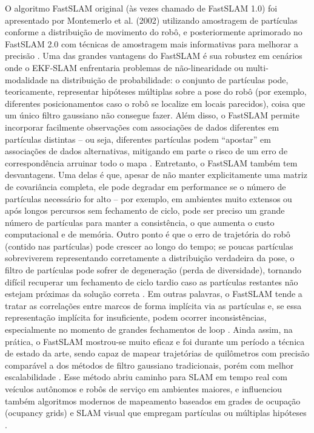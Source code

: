         O algoritmo FastSLAM original (às vezes chamado de FastSLAM 1.0) foi apresentado por Montemerlo et al. (2002) utilizando amostragem de partículas conforme a distribuição de movimento do robô, e posteriormente aprimorado no FastSLAM 2.0 com técnicas de amostragem mais informativas para melhorar a precisão \cite{Montemerlo2002}. Uma das grandes vantagens do FastSLAM é sua robustez em cenários onde o EKF-SLAM enfrentaria problemas de não-linearidade ou multi-modalidade na distribuição de probabilidade: o conjunto de partículas pode, teoricamente, representar hipóteses múltiplas sobre a pose do robô (por exemplo, diferentes posicionamentos caso o robô se localize em locais parecidos), coisa que um único filtro gaussiano não consegue fazer. Além disso, o FastSLAM permite incorporar facilmente observações com associações de dados diferentes em partículas distintas – ou seja, diferentes partículas podem “apostar” em associações de dados alternativas, mitigando em parte o risco de um erro de correspondência arruinar todo o mapa \cite{Thrun2005}. Entretanto, o FastSLAM também tem desvantagens. Uma delas é que, apesar de não manter explicitamente uma matriz de covariância completa, ele pode degradar em performance se o número de partículas necessário for alto – por exemplo, em ambientes muito extensos ou após longos percursos sem fechamento de ciclo, pode ser preciso um grande número de partículas para manter a consistência, o que aumenta o custo computacional e de memória. Outro ponto é que o erro de trajetória do robô (contido nas partículas) pode crescer ao longo do tempo; se poucas partículas sobreviverem representando corretamente a distribuição verdadeira da pose, o filtro de partículas pode sofrer de degeneração (perda de diversidade), tornando difícil recuperar um fechamento de ciclo tardio caso as partículas restantes não estejam próximas da solução correta \cite{Thrun2005}. Em outras palavras, o FastSLAM tende a tratar as correlações entre marcos de forma implícita via as partículas e, se essa representação implícita for insuficiente, podem ocorrer inconsistências, especialmente no momento de grandes fechamentos de loop \cite{Thrun2005}. Ainda assim, na prática, o FastSLAM mostrou-se muito eficaz e foi durante um período a técnica de estado da arte, sendo capaz de mapear trajetórias de quilômetros com precisão comparável a dos métodos de filtro gaussiano tradicionais, porém com melhor escalabilidade \cite{Thrun2005}. Esse método abriu caminho para SLAM em tempo real com veículos autônomos e robôs de serviço em ambientes maiores, e influenciou também algoritmos modernos de mapeamento baseados em grades de ocupação (ocupancy grids) e SLAM visual que empregam partículas ou múltiplas hipóteses \cite{Thrun2005}.

